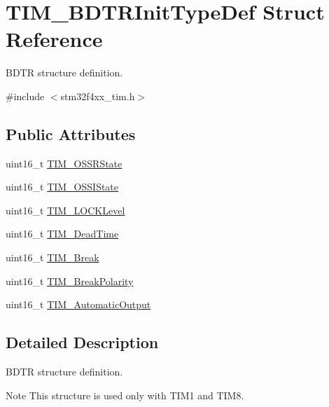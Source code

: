 \hypertarget{struct_t_i_m___b_d_t_r_init_type_def}{}\section{T\+I\+M\+\_\+\+B\+D\+T\+R\+Init\+Type\+Def Struct Reference}
\label{struct_t_i_m___b_d_t_r_init_type_def}


B\+D\+TR structure definition.  




{\ttfamily \#include $<$stm32f4xx\+\_\+tim.\+h$>$}

\subsection*{Public Attributes}
\begin{DoxyCompactItemize}
\item 
uint16\+\_\+t \hyperlink{struct_t_i_m___b_d_t_r_init_type_def_a8f34ad7bc4764bd3ff372cadde468072}{T\+I\+M\+\_\+\+O\+S\+S\+R\+State}
\item 
uint16\+\_\+t \hyperlink{struct_t_i_m___b_d_t_r_init_type_def_ad8891e3739a7db8a45343d4e2f9d2824}{T\+I\+M\+\_\+\+O\+S\+S\+I\+State}
\item 
uint16\+\_\+t \hyperlink{struct_t_i_m___b_d_t_r_init_type_def_aa5296a7b194d25b16899f6a98da01f03}{T\+I\+M\+\_\+\+L\+O\+C\+K\+Level}
\item 
uint16\+\_\+t \hyperlink{struct_t_i_m___b_d_t_r_init_type_def_a01ccbaffccdb3068b8a60c912579b1a2}{T\+I\+M\+\_\+\+Dead\+Time}
\item 
uint16\+\_\+t \hyperlink{struct_t_i_m___b_d_t_r_init_type_def_a9fcf20632d0377727476a98f7183be56}{T\+I\+M\+\_\+\+Break}
\item 
uint16\+\_\+t \hyperlink{struct_t_i_m___b_d_t_r_init_type_def_a5731e4e786b66f35cfe4798d6157619e}{T\+I\+M\+\_\+\+Break\+Polarity}
\item 
uint16\+\_\+t \hyperlink{struct_t_i_m___b_d_t_r_init_type_def_a6c056e29af67fd8a32919104ea48eea2}{T\+I\+M\+\_\+\+Automatic\+Output}
\end{DoxyCompactItemize}


\subsection{Detailed Description}
B\+D\+TR structure definition. 

\begin{DoxyNote}{Note}
This structure is used only with T\+I\+M1 and T\+I\+M8. 
\end{DoxyNote}


